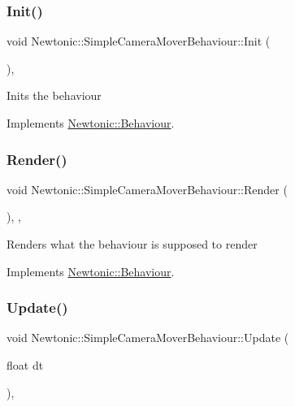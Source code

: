 \subsubsection{\texorpdfstring{Init()}{Init()}}
{\footnotesize\ttfamily void Newtonic\+::\+Simple\+Camera\+Mover\+Behaviour\+::\+Init (\begin{DoxyParamCaption}{ }\end{DoxyParamCaption})\hspace{0.3cm}{\ttfamily [override]}, {\ttfamily [virtual]}}

Inits the behaviour 

Implements \mbox{\hyperlink{classNewtonic_1_1Behaviour_a54a1d17213841de1d7bde8aaadfc99e4}{Newtonic\+::\+Behaviour}}.

\mbox{\label{classNewtonic_1_1SimpleCameraMoverBehaviour_a52037ac47383855fa58f1fbebbb75e44}} 
\subsubsection{\texorpdfstring{Render()}{Render()}}
{\footnotesize\ttfamily void Newtonic\+::\+Simple\+Camera\+Mover\+Behaviour\+::\+Render (\begin{DoxyParamCaption}{ }\end{DoxyParamCaption})\hspace{0.3cm}{\ttfamily [inline]}, {\ttfamily [override]}, {\ttfamily [virtual]}}

Renders what the behaviour is supposed to render 

Implements \mbox{\hyperlink{classNewtonic_1_1Behaviour_ab219950e152ca8b9cb6f54d024667627}{Newtonic\+::\+Behaviour}}.

\mbox{\label{classNewtonic_1_1SimpleCameraMoverBehaviour_ac2c1d4f6dc0ef16361605b0a8fd37be2}} 
\subsubsection{\texorpdfstring{Update()}{Update()}}
{\footnotesize\ttfamily void Newtonic\+::\+Simple\+Camera\+Mover\+Behaviour\+::\+Update (\begin{DoxyParamCaption}\item[{float}]{dt }\end{DoxyParamCaption})\hspace{0.3cm}{\ttfamily [override]}, {\ttfamily [virtual]}}

